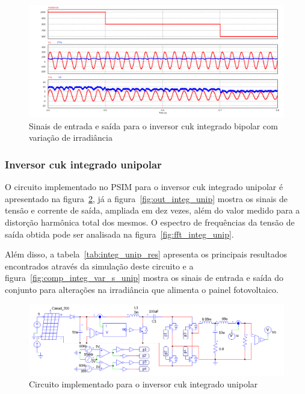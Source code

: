 \documentclass[
	12pt,				%
	openany,
	onseside,
	a4paper,			%
	english,			%
	french,				%
	spanish,			%
	brazil,				%
	]{abntex2}
\begin{document}
\begin{figure}[H]%
	\captionsetup{justification=centering}
	\centering
		\includegraphics[width= \linewidth]{comp_integ_var_s}
		\caption{Sinais de entrada e saída para o inversor cuk integrado bipolar com variação de irradiância}
		\label{fig:comp_integ_var_s}
\end{figure}

\subsubsection{Inversor cuk integrado unipolar}

O circuito implementado no PSIM para o inversor cuk integrado unipolar é apresentado na figura~\ref{fig:comp_integ_circ_clean_unip}, já a figura~\ref{fig:out_integ_unip} mostra os sinais de tensão e corrente de saída, ampliada em dez vezes, além do valor medido para a distorção harmônica total dos mesmos. O espectro de frequências da tensão de saída obtida pode ser analisada na figura~\ref{fig:fft_integ_unip}.

Além disso, a tabela~\ref{tab:integ_unip_res} apresenta os principais resultados encontrados através da simulação deste circuito e a figura~\ref{fig:comp_integ_var_s_unip} mostra os sinais de entrada e saída do conjunto para alterações na irradiância que alimenta o painel fotovoltaico.

\begin{figure}[H]%
	\captionsetup{justification=centering}
	\centering
		\includegraphics[width= \linewidth]{comp_integ_circ_clean_unip}
		\caption{Circuito implementado para o inversor cuk integrado unipolar}
		\label{fig:comp_integ_circ_clean_unip}
\end{figure}
\end{document}
